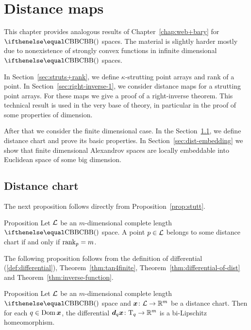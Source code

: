 \chapter{Distance maps %
}\label{chap:dist-maps}

This chapter provides analogous results of Chapter~\ref{chap:web+bary} for $\Alex{}$ spaces.
The material is slightly harder mostly due to nonexistence of strongly convex functions in infinite dimensional $\Alex{}$ spaces.

In Section~\ref{sec:struts+rank},
we define $\kappa$-strutting point arrays 
and rank of a point.
In Section~\ref{sec:right-inverse-1},
we consider distance maps for a strutting point arrays.
For these maps we give a proof of a right-inverse theorem.
This technical result is used in the very base of theory, in particular in the proof of some properties of dimension.

After that we consider the finite dimensional case.
In the Section~\ref{sec:dist-chart}, we define distance chart and prove its basic properties.
In Section~\ref{sec:dist-embedding} we show that finite dimensional Alexandrov spaces are locally embeddable into Euclidean space of some big dimension.




\section{Distance chart}\label{sec:dist-chart}


The next proposition follows directly from Proposition~\ref{prop:stutt}.

\begin{thm}{Proposition} 
Let $\mathcal{L}$ be an $m$-dimensional complete length $\Alex{}$ space.
A point $p\in \spc{L}$ belongs to some distance chart if and only if $\mathop{\rm rank}\nolimits_p=m$.
\end{thm}

The following proposition follows from the definition of differential (\ref{def:differential}), Theorem~\ref{thm:tan4finite}, Theorem~\ref{thm:differential-of-dist} and Theorem~\ref{thm:inverse-function}.%

\begin{thm}{Proposition}\label{thm:inverse-function:differential}
Let $\mathcal{L}$ be an $m$-dimensional complete length $\Alex{}$ space and $\bm{x}\:\spc{L}\to\RR^m$ be a distance chart.
Then for each $q\in\Dom\bm{x}$, 
the differential $\dd_q\bm{x}\:\T_q\to\RR^m$ is a bi-Lipschitz homeomorphism.
\end{thm}

